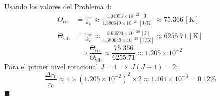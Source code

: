 \documentclass[]{article}
\numberwithin{equation}{section}
\newcommand{\0}{\textcolor{gray}{0}}
\newcommand{\qed}{\hfill\(\blacksquare\)}
\begin{document}
Usando los valores del Problema 4:
\begin{align}
	\Theta_{\mathrm{rot}} &= \frac{\epsilon_{\mathrm{rot}}}{k_B} \approx \frac{1.04053\times 10^{-21} \, \mathrm{[J]}}{1.380649 \times 10^{-23} \, \mathrm{[J/K]}} \approx 75.366 \, \mathrm{[K]}\\
	\Theta_{\mathrm{vib}} &= \frac{\epsilon_{\mathrm{vib}}}{k_B} \approx \frac{ 8.63694\times 10^{-20} \, \mathrm{[J]}}{1.380649 \times 10^{-23} \, \mathrm{[J/K]}} \approx 6255.71 \, \mathrm{[K]}
\end{align}
\begin{equation}
	\Rightarrow \frac{\Theta_{\mathrm{rot}}}{\Theta_{\mathrm{vib}}} \approx \frac{75.366}{6255.71} \approx 1.205\times10^{-2}
\end{equation}
Para el primer nivel rotacional $J=1 ~\Rightarrow~ J(J+1) = 2$:
\begin{equation}
	\frac{\Delta r_0}{r_0} \approx 4\times(1.205\times10^{-2})^2\times 2 \approx 1.161\times10^{-3} = 0.12\%
\end{equation}
\qed
\end{document}
